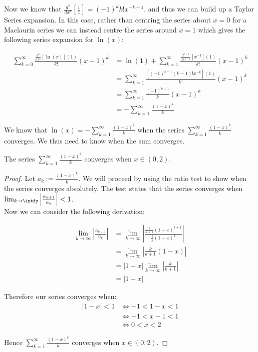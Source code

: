 Now we know that \(\frac{d^k}{dx^k}[\frac{1}{x}] = (-1)^kk!x^{-k-1}\), and thus we can build up a Taylor Series expansion. In this case, rather than centring the series about \(x=0\) for a Maclaurin series we can instead centre the series around \(x=1\) which gives the following series expansion for \(\ln(x)\):

\begin{align*}
	\sum_{k=0}^\infty \frac{\frac{d^k}{dx^k}[\ln(x)](1)}{k!}(x-1)^k
		&=\ln(1) + \sum_{k=1}^\infty\frac{\frac{d^{k-1}}{dx^{k-1}}
			[x^{-1}](1)}{k!}(x-1)^k\\
		&=\sum_{k=1}^\infty\frac{[(-1)^{k-1}(k-1)!x^{-k}](1)}
			{k!}(x-1)^k\\
		&=\sum_{k=1}^\infty\frac{(-1)^{k-1}}{k}(x-1)^k\\
		&=-\sum_{k=1}^\infty\frac{(1-x)^k}{k}
\end{align*}
				
We know that \(\ln(x) = -\sum_{k=1}^\infty\frac{(1-x)^k}{k}\) when the series \(\sum_{k=1}^\infty\frac{(1-x)^k}{k}\) converges. We thus need to know when the sum converges.

\begin{log convergence}
The series \(\sum_{k=1}^\infty\frac{(1-x)^k}{k}\) converges when \(x \in (0,2)\).
\end{log convergence}
\begin{proof}
Let \(a_k := \frac{(1-x)^k}{k}\). We will proceed by using the ratio test to show when the series converges absolutely. The test states that the series converges when \(\lim_{k\to\intfy} \left|\frac{a_{k+1}}{a_k}\right| < 1\).\\

Now we can consider the following derivation:

\begin{align*}
	\lim_{k\to\infty}\left|\frac{a_{k+1}}{a_k}\right|
		&=\lim_{k\to\infty}\left|\frac{\frac{1}{k+1}(1-x)^{k+1}}
			{\frac{1}{k}(1-x)^k}\right|\\
		&=\lim_{k\to\infty}\left|\frac{k}{k+1}(1-x)\right|\\
		&=|1-x|\lim_{k\to\infty}\left|\frac{k}{k+1}\right|\\
		&=|1-x|
\end{align*}

Therefore our series converges when:
\begin{align*}
	|1-x| < 1 &\iff -1 < 1 - x < 1\\
		&\iff -1 < x - 1 < 1\\
		&\iff 0 < x < 2
\end{align*}

Hence \(\sum_{k=1}^\infty \frac{(1-x)^k}{k}\) converges when \(x \in (0, 2)\).
\end{proof}

